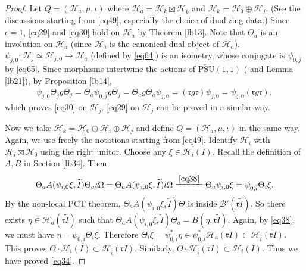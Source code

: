 \documentclass[12pt,a4paper]{article}
\theoremstyle{definition}
\theoremstyle{plain}
\newcommand{\fk}{\mathfrak}
\newcommand{\mc}{\mathcal}
\newcommand{\wtd}{\widetilde}
\newcommand{\ovl}{\overline}
\newcommand{\UPSU}{\widetilde{\mathrm{PSU}}(1,1)}
\numberwithin{equation}{section}
\begin{document}
\begin{proof}
Let $Q=(\mc H_a,\mu,\iota)$ where $\mc H_a=\mc H_k\boxtimes\mc H_{\ovl k}$ and $\mc H_k=\mc H_0\oplus\mc H_j$. (See the discussions starting from \eqref{eq49}, especially the choice of dualizing data.) Since $\epsilon=1$, \eqref{eq29} and \eqref{eq30} hold on $\mc H_a$ by Theorem \ref{lb13}. Note that $\Theta_a$ is an involution on $\mc H_a$ (since $\mc H_a$ is the canonical dual object of $\mc H_a$). $\psi_{j,0}:\mc H_j\simeq\mc H_{j,0}\rightarrow\mc H_a$ (defined by \eqref{eq64}) is an isometry, whose conjugate is $\psi_{0,\ovl j}$ by \eqref{eq65}. Since morphisms intertwine the actions of $\UPSU$ (\cite[Prop. 2.2]{GL96} and Lemma \ref{lb21}), by Proposition \ref{lb14},
\begin{align*}
\psi_{j,0}\Theta_{\ovl j}g\Theta_j=\Theta_a\psi_{0,\ovl j}g\Theta_j=\Theta_ag\Theta_a\psi_{j,0}=(\fk r g\fk r)\psi_{j,0}=\psi_{j,0}(\fk r g\fk r),
\end{align*}
which proves \eqref{eq30} on $\mc H_j$. \eqref{eq29} on $\mc H_j$ can be proved in a similar way.



Now we take $\mc H_k=\mc H_0\oplus\mc H_i\oplus\mc H_j$ and define $Q=(\mc H_a,\mu,\iota)$ in the same way. Again, we use freely the notations starting from \eqref{eq49}. Identify $\mc H_i$ with $\mc H_i\boxtimes\mc H_0$ using the right unitor. Choose any $\xi\in\mc H_i(I)$. Recall the definition of $A,B$ in Section \ref{lb34}. Then
\begin{align*}
\Theta_a A(\psi_{i,0}\xi,\wtd I)\Theta_a\iota\Omega=\Theta_a A(\psi_{i,0}\xi,\wtd I)\iota\Omega \xlongequal{\eqref{eq38}} \Theta_a\psi_{i,0}\xi=\psi_{0,\ovl i}\Theta_i\xi.
\end{align*}
By the non-local PCT theorem,  $\Theta_a A(\psi_{i,0}\xi,\wtd I)\Theta$ is inside $\mc B'(\fk r\wtd I)$. So there exists $\eta\in\mc H_a(\fk r\wtd I)$ such that $\Theta_a A(\psi_{i,0}\xi,\wtd I)\Theta_a=B(\eta,\fk r\wtd I)$. Again, by \eqref{eq38}, we must have $\eta=\psi_{0,\ovl i}\Theta_i\xi$. Therefore $\Theta_i\xi=\psi_{0,\ovl i}^*\eta\in\psi_{0,\ovl i}^*\mc H_a(\fk rI)\subset \mc H_{\ovl i}(\fk rI)$. This proves $\Theta\cdot\mc H_i(I)\subset\mc H_{\ovl i}(\fk r I)$. Similarly, $\Theta\cdot\mc H_{\ovl i}(\fk rI)\subset\mc H_i(I)$. Thus we have proved \eqref{eq34}.


\end{proof}
\end{document}
